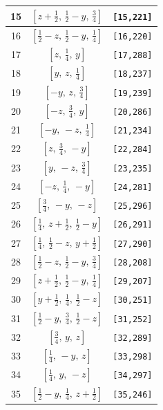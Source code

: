 \documentclass[fleqn,8pt]{jsarticle}
\begin{document}
\begin{longtable}{ccc}
15 & $\left[ z + \frac{1}{2},\, \frac{1}{2} - y,\, \frac{3}{4} \right]$ & {\tt [15,221]} \\ \hline
16 & $\left[ \frac{1}{2} - z,\, \frac{1}{2} - y,\, \frac{1}{4} \right]$ & {\tt [16,220]} \\ \hline
17 & $\left[ z,\, \frac{1}{4},\, y \right]$ & {\tt [17,288]} \\ \hline
18 & $\left[ y,\, z,\, \frac{1}{4} \right]$ & {\tt [18,237]} \\ \hline
19 & $\left[ - y,\, z,\, \frac{3}{4} \right]$ & {\tt [19,239]} \\ \hline
20 & $\left[ - z,\, \frac{3}{4},\, y \right]$ & {\tt [20,286]} \\ \hline
21 & $\left[ - y,\, - z,\, \frac{1}{4} \right]$ & {\tt [21,234]} \\ \hline
22 & $\left[ z,\, \frac{3}{4},\, - y \right]$ & {\tt [22,284]} \\ \hline
23 & $\left[ y,\, - z,\, \frac{3}{4} \right]$ & {\tt [23,235]} \\ \hline
24 & $\left[ - z,\, \frac{1}{4},\, - y \right]$ & {\tt [24,281]} \\ \hline
25 & $\left[ \frac{3}{4},\, - y,\, - z \right]$ & {\tt [25,296]} \\ \hline
26 & $\left[ \frac{1}{4},\, z + \frac{1}{2},\, \frac{1}{2} - y \right]$ & {\tt [26,291]} \\ \hline
27 & $\left[ \frac{1}{4},\, \frac{1}{2} - z,\, y + \frac{1}{2} \right]$ & {\tt [27,290]} \\ \hline
28 & $\left[ \frac{1}{2} - z,\, \frac{1}{2} - y,\, \frac{3}{4} \right]$ & {\tt [28,208]} \\ \hline
29 & $\left[ z + \frac{1}{2},\, \frac{1}{2} - y,\, \frac{1}{4} \right]$ & {\tt [29,207]} \\ \hline
30 & $\left[ y + \frac{1}{2},\, \frac{1}{4},\, \frac{1}{2} - z \right]$ & {\tt [30,251]} \\ \hline
31 & $\left[ \frac{1}{2} - y,\, \frac{3}{4},\, \frac{1}{2} - z \right]$ & {\tt [31,252]} \\ \hline
32 & $\left[ \frac{3}{4},\, y,\, z \right]$ & {\tt [32,289]} \\ \hline
33 & $\left[ \frac{1}{4},\, - y,\, z \right]$ & {\tt [33,298]} \\ \hline
34 & $\left[ \frac{1}{4},\, y,\, - z \right]$ & {\tt [34,297]} \\ \hline
35 & $\left[ \frac{1}{2} - y,\, \frac{1}{4},\, z + \frac{1}{2} \right]$ & {\tt [35,246]} \\ \hline

\end{longtable}
\end{document}
